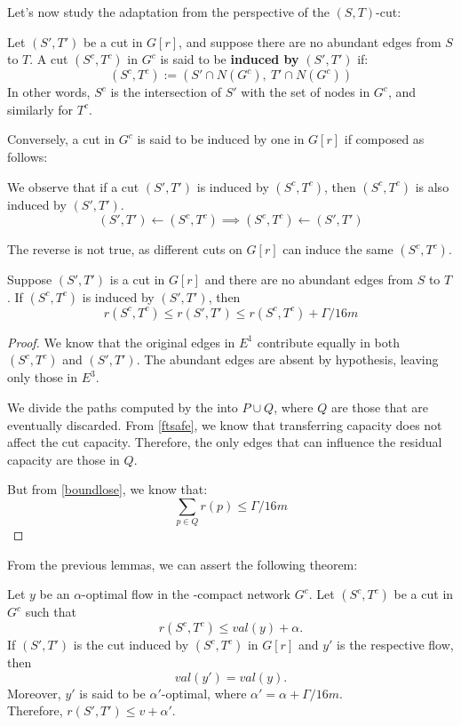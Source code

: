 Let’s now study the adaptation from the perspective of the \((S,T)\)-cut:

Let \((S',T')\) be a cut in \( G[r] \), and suppose there are no abundant edges from \( S \) to \( T \).  
A cut \((S^c, T^c)\) in \( G^c \) is said to be \textbf{induced by} \((S', T')\) if:
\[
(S^c, T^c) := (S' \cap N(G^c),\ T' \cap N(G^c))
\]
In other words, \( S^c \) is the intersection of \( S' \) with the set of nodes in \( G^c \), and similarly for \( T^c \).

Conversely, a cut in \( G^c \) is said to be induced by one in \( G[r] \) if composed as follows:

\begin{obs}
    We observe that if a cut \((S',T')\) is induced by \((S^c,T^c)\), then \((S^c,T^c)\) is also induced by \((S',T')\).
    \[
    (S',T')\leftarrow(S^c,T^c)\implies (S^c,T^c)\leftarrow(S',T')
    \]

    The reverse is not true, as different cuts on \( G[r] \) can induce the same \((S^c,T^c)\).
\end{obs}

\begin{lemma}
    Suppose \((S',T')\) is a cut in \( G[r] \) and there are no abundant edges from \( S \) to \( T \). If \((S^c,T^c)\) is induced by \((S',T')\), then
    \[
    r(S^c,T^c) \leq r(S',T') \leq r(S^c,T^c) + \Gamma / 16m
    \]
\end{lemma}

\begin{proof}
    We know that the original edges in \( E^1 \) contribute equally in both \((S^c,T^c)\) and \((S',T')\). The abundant edges are absent by hypothesis, leaving only those in \( E^3 \).
    
    We divide the paths computed by the  into \( P \cup Q \), where \( Q \) are those that are eventually discarded.
    From \cref{ftsafe}, we know that transferring capacity does not affect the cut capacity. Therefore, the only edges that can influence the residual capacity are those in \( Q \).
    
    But from \cref{boundlose}, we know that:
    \[
    \sum_{p \in Q} r(p) \leq \Gamma / 16m
    \]
\end{proof}

From the previous lemmas, we can assert the following theorem:

\begin{theorem}
    Let \( y \) be an \(\alpha\)-optimal flow in the \gmm-compact network \( G^c \).
    Let \((S^c, T^c)\) be a cut in \( G^c \) such that \[ r(S^c, T^c) \leq val(y) + \alpha. \]
    If \((S', T')\) is the cut induced by \((S^c, T^c)\) in \( G[r] \) and \( y' \) is the respective flow, then
    \[
    val(y') = val(y).
    \]
    Moreover, \( y' \) is said to be \(\alpha'\)-optimal, where \(\alpha' = \alpha + \Gamma / 16m\).\\
    Therefore, \( r(S', T') \leq v + \alpha'. \)
\end{theorem}


